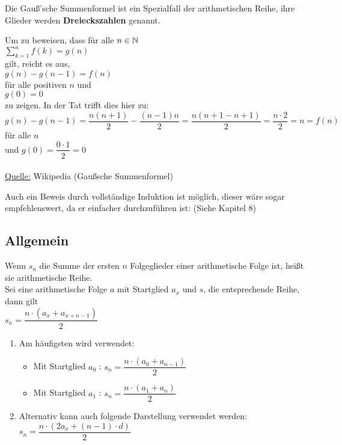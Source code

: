 \begin{Bemerkung}
Die Gauß'sche Summenformel ist ein Spezialfall der arithmetischen Reihe, ihre Glieder werden \textbf{Dreieckszahlen} genannt.
\end{Bemerkung}

\begin{Beweis}
Um zu beweisen, dass für alle $n\in\mathbb{N}$\\
$\sum\limits_{k=1}^{n}f(k)=g(n)$\\
 gilt, reicht es aus, \\
$g(n)-g(n-1)=f(n)$\\
 für alle positiven $n$ und\\
 $g(0)=0$\\
 zu zeigen. In der Tat trifft dies hier zu: \\
$g(n)-g(n-1)=\dfrac{n(n+1)}{2}-\dfrac{(n-1)n}{2}=\dfrac{n(n+1-n+1)}{2}=\dfrac{n\cdot 2}{2}=n=f(n)$ \\
für alle $n$ \\
und $g(0)=\dfrac{0\cdot 1}{2}=0$\\
\\
\underline{Quelle:} Wikipedia (Gaußsche Summenformel)\\
\end{Beweis}
\begin{Bemerkung}
Auch ein Beweis durch vollständige Induktion ist möglich, dieser wäre sogar empfehlenswert, da er einfacher durchzuführen ist: (Siehe Kapitel 8)
\end{Bemerkung}


	\subsection{Allgemein}

\begin{Definition}
Wenn $s_{n}$ die Summe der ersten $n$ Folgeglieder einer arithmetische Folge ist, heißt sie arithmetische Reihe.\\
Sei eine arithmetische Folge $a$ mit Startglied $a_{x}$ und $s$, die entsprechende Reihe, dann gilt\\
$s_{n}=\dfrac{n\cdot(a_{x}+a_{x+n-1})}{2}$
\end{Definition}

\begin{Bemerkung}
\begin{enumerate}
\item Am häufigsten wird verwendet:
\begin{itemize}
\item Mit Startglied $a_{0}$ : $s_{n}=\dfrac{n\cdot(a_{0}+a_{n-1})}{2}$
\item Mit Startglied $a_{1}$ : $s_{n}=\dfrac{n\cdot(a_{1}+a_{n})}{2}$
\end{itemize}
\item Alternativ kann auch folgende Darstellung verwendet werden:\\
$s_{n}=\dfrac{n\cdot(2a_{x}+(n-1)\cdot d)}{2}$
\end{enumerate}
\end{Bemerkung}

